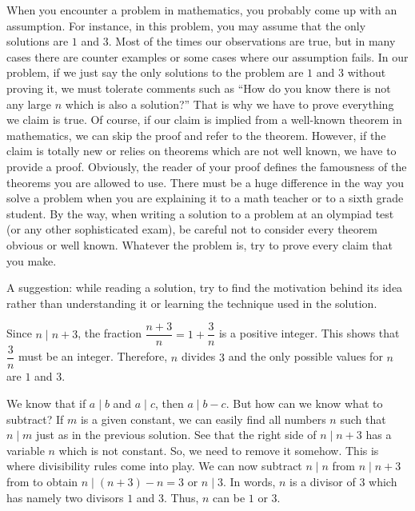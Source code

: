 \documentclass{subfile}
\begin{document}
	When you encounter a problem in mathematics, you probably come up with an assumption. For instance, in this problem, you may assume that the only solutions are $1$ and $3$. Most of the times our observations are true, but in many cases there are counter examples or some cases where our assumption fails. In our problem, if we just say the only solutions to the problem are $1$ and $3$ without proving it, we must tolerate comments such as ``How do you know there is not any large $n$ which is also a solution?'' That is why we have to prove everything we claim is true. Of course, if our claim is implied from a well-known theorem in mathematics, we can skip the proof and refer to the theorem. However, if the claim is totally new or relies on theorems which are not well known, we have to provide a proof. Obviously, the reader of your proof defines the famousness of the theorems you are allowed to use. There must be a huge difference in the way you solve a problem when you are explaining it to a math teacher or to a sixth grade student. By the way, when writing a solution to a problem at an olympiad test (or any other sophisticated exam), be careful not to consider every theorem obvious or well known. Whatever the problem is, try to prove every claim that you make.

	A suggestion: while reading a solution, try to find the motivation behind its idea rather than understanding it or learning the technique used in the solution.

		\begin{solution}
			Since $n\mid n+3$, the fraction $\dfrac{n+3}{n}=1+\dfrac{3}{n}$ is a positive integer. This shows that $\dfrac{3}{n}$ must be an integer. Therefore, $n$ divides $3$ and the only possible values for $n$ are $1$ and $3$.
		\end{solution}

		\begin{solution}
			We know that if $a\mid b$ and $a\mid c$, then $a\mid b-c$. But how can we know what to subtract? If $m$ is a given constant, we can easily find all numbers $n$ such that $n\mid m$ just as in the previous solution. See that the right side of $n\mid n+3$ has a variable $n$ which is not constant. So, we need to remove it somehow. This is where divisibility rules come into play. We can now subtract $n\mid n$ from $n\mid n+3$ from to obtain $n\mid (n+3)-n=3$ or $n\mid 3$. In words, $n$ is a divisor of $3$ which has namely two divisors $1$ and $3$. Thus, $n$ can be $1$ or $3$.
		\end{solution}
\end{document}
